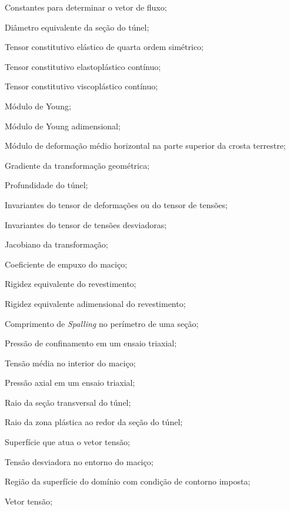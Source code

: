 \item[\textbf{Latino maiúsculo:}]
\item[$C_1, C_2, C_3$]	Constantes para determinar o vetor de fluxo;
\item[$D$]				Diâmetro equivalente da seção do túnel;
\item[$\Dllll$] Tensor constitutivo elástico de quarta ordem simétrico;
\item[$\Dllll^{ep}$] Tensor constitutivo elastoplástico contínuo;
\item[$\Dllll^{vp}$] Tensor constitutivo viscoplástico contínuo;
\item[$E$]				Módulo de Young;
\item[$E^*$]			Módulo de Young adimensional;
\item[$E_h$]			Módulo de deformação médio horizontal na parte superior da crosta terrestre;
\item[$\Fll$]			Gradiente da transformação geométrica;
\item[$H$]				Profundidade do túnel;
\item[$I_1,I_2,I_3$] 	Invariantes do tensor de deformações ou do tensor de tensões;
\item[$J_1,J_2,J_3$] 	Invariantes do tensor de tensões desviadoras;
\item[$ J $] 	Jacobiano da transformação;
\item[$K$]				Coeficiente de empuxo do maciço;
\item[$K_r$]			Rigidez equivalente do revestimento;
\item[$K_r^*$]			Rigidez equivalente adimensional do revestimento;
\item[$L_s$]			Comprimento de \textit{Spalling} no perímetro de uma seção;
\item[$ P $] 			Pressão de confinamento em um ensaio triaxial;
\item[$ P_0 $] 			Tensão média no interior do maciço;
\item[$ Q $] 			Pressão axial em um ensaio triaxial;
\item[$ R $]			Raio da seção transversal do túnel;
\item[$ R^p $]			Raio da zona plástica ao redor da seção do túnel;
\item[$ S $] 			Superfície que atua o vetor tensão;
\item[$ S_0 $] 			Tensão desviadora no entorno do maciço;
\item[$ S_T $] 			Região da superfície do domínio com condição de contorno imposta;
\item[$ \Tl $] 			Vetor tensão;

